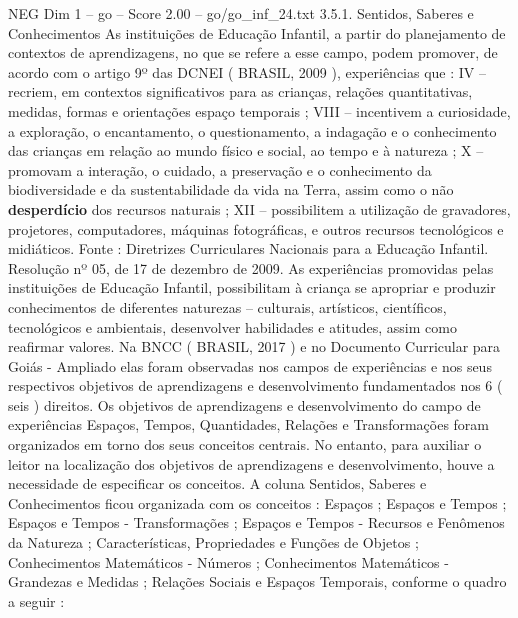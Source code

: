 \begin{textsample}{NEG Dim 1 – go – Score 2.00 – go/go\_inf\_24.txt}  \label{ex:f1_neg_193}
3.5.1.
Sentidos, Saberes e Conhecimentos As instituições de Educação Infantil, a partir do planejamento de contextos de aprendizagens, no que se refere a esse campo, podem promover, de acordo com o artigo 9º das DCNEI ( BRASIL, 2009 ), experiências que : IV – recriem, em contextos significativos para as crianças, relações quantitativas, medidas, formas e orientações espaço temporais ; VIII – incentivem a curiosidade, a exploração, o encantamento, o questionamento, a indagação e o conhecimento das crianças em relação ao mundo físico e social, ao tempo e à natureza ; X – promovam a interação, o cuidado, a preservação e o conhecimento da biodiversidade e da sustentabilidade da vida na Terra, assim como o não \textbf{desperdício} dos recursos naturais ; XII – possibilitem a utilização de gravadores, projetores, computadores, máquinas fotográficas, e outros recursos tecnológicos e midiáticos.
Fonte : Diretrizes Curriculares Nacionais para a Educação Infantil.
Resolução nº 05, de 17 de dezembro de 2009.
As experiências promovidas pelas instituições de Educação Infantil, possibilitam à criança se apropriar e produzir conhecimentos de diferentes naturezas – culturais, artísticos, científicos, tecnológicos e ambientais, desenvolver habilidades e atitudes, assim como reafirmar valores.
Na BNCC ( BRASIL, 2017 ) e no Documento Curricular para Goiás - Ampliado elas foram observadas nos campos de experiências e nos seus respectivos objetivos de aprendizagens e desenvolvimento fundamentados nos 6 ( seis ) direitos.
Os objetivos de aprendizagens e desenvolvimento do campo de experiências Espaços, Tempos, Quantidades, Relações e Transformações foram organizados em torno dos seus conceitos centrais.
No entanto, para auxiliar o leitor na localização dos objetivos de aprendizagens e desenvolvimento, houve a necessidade de especificar os conceitos.
A coluna Sentidos, Saberes e Conhecimentos ficou organizada com os conceitos : Espaços ; Espaços e Tempos ; Espaços e Tempos - Transformações ; Espaços e Tempos - Recursos e Fenômenos da Natureza ; Características, Propriedades e Funções de Objetos ; Conhecimentos Matemáticos - Números ; Conhecimentos Matemáticos - Grandezas e Medidas ; Relações Sociais e Espaços Temporais, conforme o quadro a seguir :

\end{textsample}
